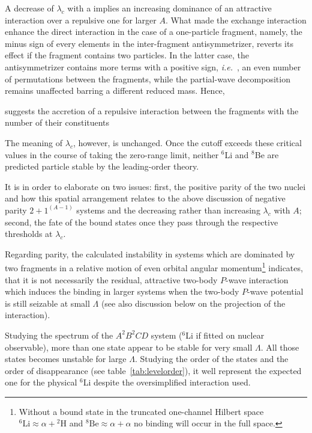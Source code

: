 \documentclass[preprint,12pt]{elsarticle}
\newcommand{\lc}{\ensuremath{\lambda_c}}
\newcommand{\abb}{\ensuremath{2\!+\!1^{(A-1)}}}
\newcommand{\ie}{\textit{i.e.}~}
\newcommand{\tabref}[1]{table~\ref{#1}}
\begin{document}
A decrease of $\lc$ with a implies an increasing dominance of an attractive interaction over a repulsive
one for larger $A$. What made the exchange interaction enhance the direct interaction in the case of
a one-particle fragment, namely, the minus sign of every elements in the inter-fragment antisymmetrizer,
reverts its effect if the fragment contains two particles. In the latter case, the antisymmetrizer contains
more terms with a positive sign, \ie, an even number of permutations between the fragments, while the
partial-wave decomposition remains unaffected barring a different reduced mass. Hence, 


 suggests the accretion of a repulsive
interaction between the fragments with the number of their constituents

The meaning of $\lc$, however, is unchanged.
Once the cutoff exceeds these critical values in the course of taking the
zero-range limit, neither $^6$Li and $^8$Be are predicted particle stable
by the leading-order theory.

It is in order to elaborate on two issues: first, the positive parity of the
two nuclei and how this spatial arrangement relates to the above discussion of
negative parity $\abb$ systems and the decreasing rather than increasing $\lc$ with $A$;
second, the fate of the bound states once they pass through the respective thresholds at $\lc$.

Regarding parity, the calculated instability in systems which are dominated by
two fragments in a relative motion of even orbital angular
momentum\footnote{Without a bound state in the truncated one-channel Hilbert space
$^6\text{Li}\approx\alpha+{}^2\text{H}$ and $^8\text{Be}\approx\alpha+\alpha$ no
binding will occur in the full space.} indicates, that it is not necessarily the
residual, attractive two-body $P$-wave interaction which induces the binding
in larger systems
when the two-body $P$-wave potential is still seizable at small $\Lambda$
(see also discussion below on the projection of the interaction).


Studying the spectrum of the $A^2B^2CD$ system ($^6$Li if fitted on nuclear observable), more than one state appear to be stable for very small $\Lambda$.
All those states becomes unstable for large $\Lambda$. 
Studying the order of the states and the order of disappearance (see \tabref{tab:levelorder}), it well represent the expected one for the physical $^6$Li despite the oversimplified interaction used.
\end{document}
